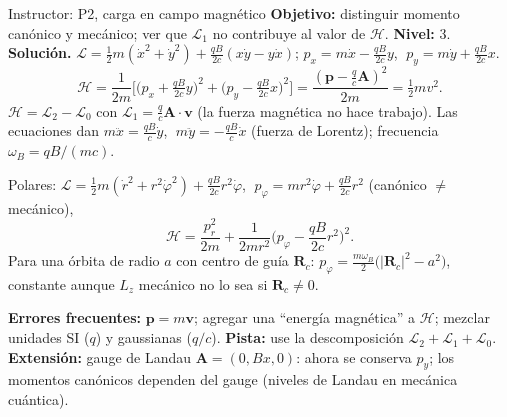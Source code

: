 \documentclass[spanish]{beamer}
\newcommand{\Lag}{\mathcal{L}}               %
\newcommand{\Ham}{\mathcal{H}}               %
\begin{document}
\begin{frame}{Instructor: P2, carga en campo magnético}
\scriptsize
\textbf{Objetivo:} distinguir momento canónico y mecánico; ver que $\Lag_1$ no
contribuye al valor de $\Ham$.
\textbf{Nivel:} 3.
\textbf{Solución.}
$\Lag=\tfrac12 m(\dot x^2+\dot y^2)+\frac{qB}{2c}(x\dot y-y\dot x)$;
$p_x=m\dot x-\frac{qB}{2c}y$, $\;p_y=m\dot y+\frac{qB}{2c}x$.
\[
  \Ham=\frac{1}{2m}\Big[\big(p_x+\tfrac{qB}{2c}y\big)^2+\big(p_y-\tfrac{qB}{2c}x\big)^2\Big]
      =\frac{(\mathbf p-\frac qc\mathbf A)^2}{2m}=\tfrac12 mv^2 .
\]
$\Ham=\Lag_2-\Lag_0$ con $\Lag_1=\frac qc\mathbf A\cdot\mathbf v$ (la fuerza magnética no hace trabajo).
Las ecuaciones dan $m\ddot x=\frac{qB}{c}\dot y$, $\;m\ddot y=-\frac{qB}{c}\dot x$ (fuerza de Lorentz);
frecuencia $\omega_B=qB/(mc)$.

Polares: $\Lag=\tfrac12 m(\dot r^2+r^2\dot\varphi^2)+\frac{qB}{2c}r^2\dot\varphi$,
$\;p_\varphi=mr^2\dot\varphi+\frac{qB}{2c}r^2$ (canónico $\neq$ mecánico),
\[
  \Ham=\frac{p_r^2}{2m}+\frac{1}{2mr^2}\Big(p_\varphi-\frac{qB}{2c}r^2\Big)^2 .
\]
Para una órbita de radio $a$ con centro de guía $\mathbf R_c$:
$p_\varphi=\frac{m\omega_B}{2}\big(|\mathbf R_c|^2-a^2\big)$, constante aunque $L_z$
mecánico no lo sea si $\mathbf R_c\neq0$.

\medskip
\textbf{Errores frecuentes:} $\mathbf p=m\mathbf v$; agregar una “energía magnética” a $\Ham$;
mezclar unidades SI ($q$) y gaussianas ($q/c$).
\textbf{Pista:} use la descomposición $\Lag_2+\Lag_1+\Lag_0$.
\textbf{Extensión:} gauge de Landau $\mathbf A=(0,Bx,0)$: ahora se conserva $p_y$;
los momentos canónicos dependen del gauge (niveles de Landau en mecánica cuántica).
\end{frame}
\end{document}
